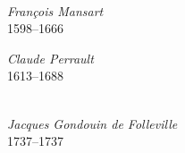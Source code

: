 \noindent
\begin{minipage}[t]{0.570\textwidth}
  \\[0.3em]
  \begin{minipage}[t]{0.48\linewidth}
    \raggedright
    {\figcaptionname\itshape François Mansart}\\[-6pt]
    {\figcaptiondetail\textup{1598--1666}}
  \end{minipage}%
  \hfill%
  \begin{minipage}[t]{0.48\linewidth}
    \raggedleft
    {\figcaptionname\itshape Claude Perrault}\\[-6pt]
    {\figcaptiondetail\textup{1613--1688}}
  \end{minipage}
\end{minipage}
\hfill
\begin{minipage}[t]{0.360\textwidth}
  \begin{flushright}
    \\[0.3em]
    {\figcaptionname\itshape Jacques Gondouin de Folleville}\\[-6pt]
    {\figcaptiondetail\textup{1737--1737}}
  \end{flushright}
\end{minipage}

\vspace*{\fill}

